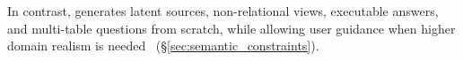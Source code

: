 In contrast, \name generates latent sources, non-relational views, executable answers, and multi-table questions from scratch, while allowing user guidance when higher domain realism is needed~\cite{5.12,brown2020} (§\ref{sec:semantic_constraints}).


